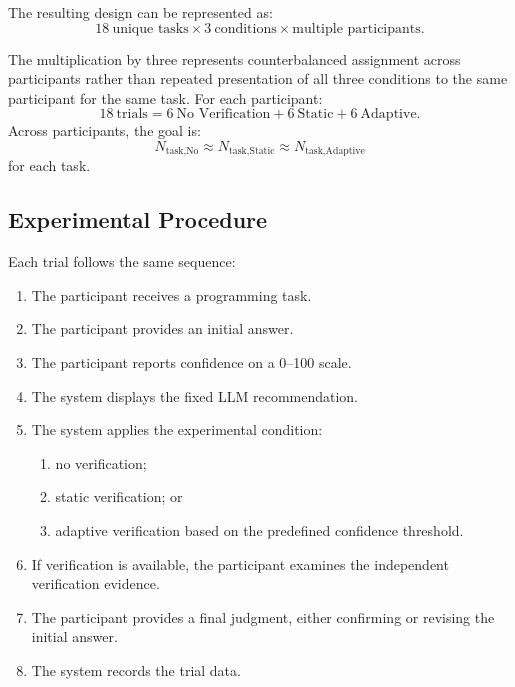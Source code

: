 \documentclass[oneside,final,14pt,a4paper]{extreport}
\theoremstyle{definition}
\theoremstyle{remark}
\begin{document}
The resulting design can be represented as:
\[
18\ \text{unique tasks}
\times
3\ \text{conditions}
\times
\text{multiple participants}.
\]

The multiplication by three represents counterbalanced assignment across
participants rather than repeated presentation of all three conditions to the
same participant for the same task. For each participant:
\[
18\ \text{trials}
=
6\ \text{No Verification}
+
6\ \text{Static}
+
6\ \text{Adaptive}.
\]
Across participants, the goal is:
\[
N_{\text{task,No}}
\approx
N_{\text{task,Static}}
\approx
N_{\text{task,Adaptive}}
\]
for each task.

\subsection{Experimental Procedure}
Each trial follows the same sequence:
\begin{enumerate}
    \item The participant receives a programming task.
    \item The participant provides an initial answer.
    \item The participant reports confidence on a 0--100 scale.
    \item The system displays the fixed LLM recommendation.
    \item The system applies the experimental condition:
    \begin{enumerate}
        \item no verification;
        \item static verification; or
        \item adaptive verification based on the predefined confidence
        threshold.
    \end{enumerate}
    \item If verification is available, the participant examines the
    independent verification evidence.
    \item The participant provides a final judgment, either confirming or
    revising the initial answer.
    \item The system records the trial data.
\end{enumerate}
\end{document}
